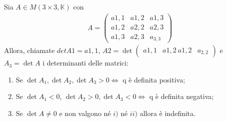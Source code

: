\documentclass[a4paper, oneside]{article}
\begin{document}
        \begin{theorem}
            Sia $A \in M(3 \times 3, \mathbb{K})$ con
            \begin{gather*}
                A= \begin{pmatrix}
                    a{1, 1} & a{1, 2} & a{1, 3} \\
                    a{1, 2} & a{2, 2} & a{2, 3} \\
                    a{1, 3} & a{2, 3} & a_{3, 3}
                \end{pmatrix}
            \end{gather*}
            Allora, chiamate $det A1 = a{1, 1}$, $A2 = \det \begin{pmatrix}
                a{1, 1} & a{1, 2} \
                a{1, 2} & a_{2, 2}
            \end{pmatrix}$ e $A_3 = \det A$ i determinanti delle matrici:
            \begin{enumerate}[$i)$]
                \item Se $\det A_1, \det A_2, \det A_3 > 0 \Longleftrightarrow $ q è definita positiva;
                \item Se $\det A_1 < 0$, $\det A_2 > 0, \det A_3 < 0 \Longleftrightarrow $ q è definita negativa;
                \item Se $\det A \neq 0$ e non valgono né $i)$ né $ii)$ allora è indefinita.
            \end{enumerate}
        \end{theorem}
        
\end{document}
